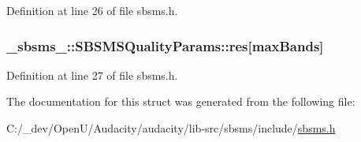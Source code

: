 Definition at line 26 of file sbsms.\+h.

\subsubsection[{\texorpdfstring{res}{res}}]{ \+\_\+sbsms\+\_\+\+::\+S\+B\+S\+M\+S\+Quality\+Params\+::res\mbox{[}{\bf max\+Bands}\mbox{]}}\hypertarget{struct__sbsms___1_1_s_b_s_m_s_quality_params_a588c35d09633cc190deb59e960f6056b}{}\label{struct__sbsms___1_1_s_b_s_m_s_quality_params_a588c35d09633cc190deb59e960f6056b}


Definition at line 27 of file sbsms.\+h.



The documentation for this struct was generated from the following file\+:\begin{DoxyCompactItemize}
\item 
C\+:/\+\_\+dev/\+Open\+U/\+Audacity/audacity/lib-\/src/sbsms/include/\hyperlink{sbsms_8h}{sbsms.\+h}\end{DoxyCompactItemize}
